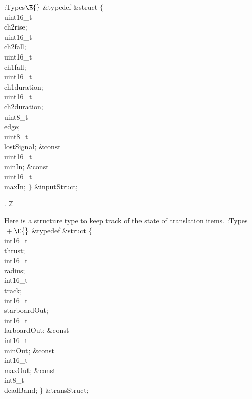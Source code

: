 \Y\B\4:Types\X${}\E{}$\6
\&{typedef} \&{struct} ${}\{{}$\1\6
\\{uint16\_t}\\{ch2rise};\6
\\{uint16\_t}\\{ch2fall};\6
\\{uint16\_t}\\{ch1fall};\6
\\{uint16\_t}\\{ch1duration};\6
\\{uint16\_t}\\{ch2duration};\6
\\{uint8\_t}\\{edge};\6
\\{uint8\_t}\\{lostSignal};\7
\&{const} \\{uint16\_t}\\{minIn};\6
\&{const} \\{uint16\_t}\\{maxIn};\2\6
${}\}{}$ \&{inputStruct};\par
{}.
\U2.\fi

Here is a structure type to keep track of the state of translation items.
\Y\B\4:Types\X${}\mathrel+\E{}$\6
\&{typedef} \&{struct} ${}\{{}$\1\6
\\{int16\_t}\\{thrust};\6
\\{int16\_t}\\{radius};\6
\\{int16\_t}\\{track};\6
\\{int16\_t}\\{starboardOut};\6
\\{int16\_t}\\{larboardOut};\7
\&{const} \\{int16\_t}\\{minOut};\6
\&{const} \\{int16\_t}\\{maxOut};\6
\&{const} \\{int8\_t}\\{deadBand};\2\6
${}\}{}$ \&{transStruct};\par
\fi


